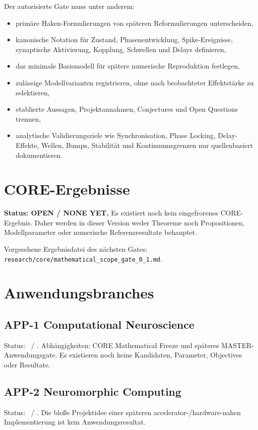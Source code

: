 \documentclass[11pt,a4paper]{article}
\newcommand{\status}[2]{\tcbox[on line,boxrule=0pt,arc=1.5pt,left=4pt,right=4pt,top=2pt,bottom=2pt,colback=#2!12,coltext=#2,fontupper=\bfseries\footnotesize]{#1}}
\newcommand{\WAIT}{\status{WAIT}{graydark}}
\newcommand{\PROTECTED}{\status{PROTECTED}{purple}}
\begin{document}
Der autorisierte Gate muss unter anderem:
\begin{itemize}
\item primäre Haken-Formulierungen von späteren Reformulierungen unterscheiden,
\item kanonische Notation für Zustand, Phasenentwicklung, Spike-Ereignisse, synaptische Aktivierung, Kopplung, Schwellen und Delays definieren,
\item das minimale Basismodell für spätere numerische Reproduktion festlegen,
\item zulässige Modellvarianten registrieren, ohne nach beobachteter Effektstärke zu selektieren,
\item etablierte Aussagen, Projektannahmen, Conjectures und Open Questions trennen,
\item analytische Validierungsziele wie Synchronisation, Phase Locking, Delay-Effekte, Wellen, Bumps, Stabilität und Kontinuumsgrenzen nur quellenbasiert dokumentieren.
\end{itemize}

\section{CORE-Ergebnisse}

\begin{warningbox}
\textbf{Status: OPEN / NONE YET.} Es existiert noch kein eingefrorenes CORE-Ergebnis. Daher werden in dieser Version weder Theoreme noch Propositionen, Modellparameter oder numerische Referenzresultate behauptet.
\end{warningbox}

Vorgesehene Ergebnisdatei des nächsten Gates: \texttt{research/core/mathematical\_scope\_gate\_0\_1.md}.

\section{Anwendungsbranches}

\subsection{APP-1 Computational Neuroscience}
Status: \PROTECTED\ / \WAIT. Abhängigkeiten: CORE Mathematical Freeze und späteres MASTER-Anwendungsgate. Es existieren noch keine Kandidaten, Parameter, Objectives oder Resultate.

\subsection{APP-2 Neuromorphic Computing}
Status: \PROTECTED\ / \WAIT. Die bloße Projektidee einer späteren accelerator-/hardware-nahen Implementierung ist kein Anwendungsresultat.
\end{document}

